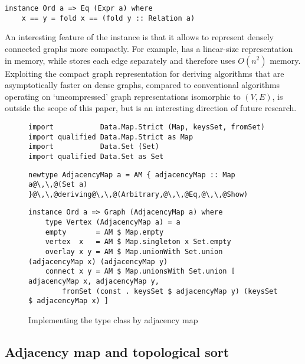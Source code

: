 \begin{verbatim}
instance Ord a => Eq (Expr a) where
    x == y = fold x == (fold y :: Relation a)
\end{verbatim}

An interesting feature of the  instance is that it allows to represent
densely connected graphs more compactly. For example, 
has a linear-size representation in memory, while 
stores each edge separately and therefore uses $O(n^2)$ memory. Exploiting the
compact graph representation for deriving algorithms that are asymptotically faster
on dense graphs, compared to conventional algorithms operating on `uncompressed'
graph representations isomorphic to $(V,E)$, is outside the scope of this paper,
but is an interesting direction of future research.

\begin{figure}[b]
\vspace{-2mm}
\begin{verbatim}
import           Data.Map.Strict (Map, keysSet, fromSet)
import qualified Data.Map.Strict as Map
import           Data.Set (Set)
import qualified Data.Set as Set
\end{verbatim}
\vspace{1mm}
\begin{verbatim}
newtype AdjacencyMap a = AM { adjacencyMap :: Map a@\,\,@(Set a) }@\,\,@deriving@\,\,@(Arbitrary,@\,\,@Eq,@\,\,@Show)
\end{verbatim}
\vspace{1mm}
\begin{verbatim}
instance Ord a => Graph (AdjacencyMap a) where
    type Vertex (AdjacencyMap a) = a
    empty       = AM $ Map.empty
    vertex  x   = AM $ Map.singleton x Set.empty
    overlay x y = AM $ Map.unionWith Set.union (adjacencyMap x) (adjacencyMap y)
    connect x y = AM $ Map.unionsWith Set.union [ adjacencyMap x, adjacencyMap y,
        fromSet (const . keysSet $ adjacencyMap y) (keysSet $ adjacencyMap x) ]
\end{verbatim}
\vspace{-3mm}
\caption{Implementing the  type class by adjacency map\label{fig-adjacency-map}}
\vspace{-1mm}
\end{figure}

\subsection{Adjacency map and topological sort}\label{sub-adjacency-map}

